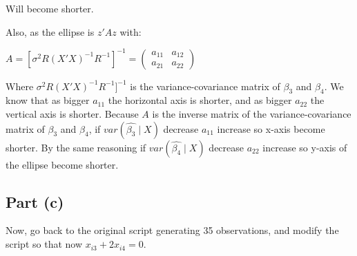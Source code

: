 \documentclass[12pt,a4paper]{article}
\begin{document}
\begin{enumerate}[label=(\roman*)]
Will become shorter.

Also, as the ellipse is $z'Az $ with:

\begin{center}
    $A = [\sigma^2R(X'X)^{-1}R^{-1}]^{-1} =
\begin{pmatrix}
a_{11} & a_{12}\\
a_{21} & a_{22}
\end{pmatrix}
$
\end{center}

Where $\sigma^2R(X'X)^{-1}R^{-1}]^{-1}$ is the variance-covariance matrix of $\beta_3$ and $\beta_4$. We know that as bigger $a_{11}$ the horizontal axis is shorter, and as bigger $a_{22}$ the vertical axis is shorter. Because $A$ is the inverse matrix of the variance-covariance matrix of $\beta_3$ and $\beta_4$, if $var(\hat{\beta_3}\mid X)$ decrease $a_{11}$ increase so x-axis become shorter. By the same reasoning if $var(\hat{\beta_4}\mid X)$ decrease $a_{22}$ increase so y-axis of the ellipse become shorter.

  
\end{enumerate}

\subsection*{Part (c)}
Now, go back to the original script generating 35 observations, and modify the script so that now $x_{i3} + 2x_{i4} = 0$.
\end{document}
